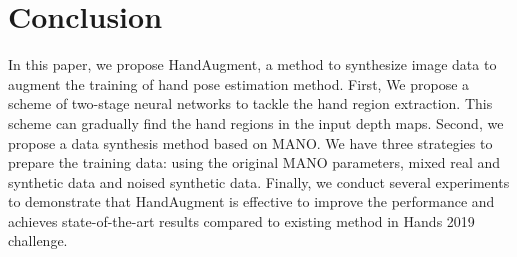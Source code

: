 \documentclass{article}
\begin{document}
\section{Conclusion}
In this paper, we propose HandAugment, a method to synthesize image data to augment the training of hand pose estimation method. 
First, We propose a scheme of two-stage neural networks to tackle the hand region extraction. This scheme can gradually find the hand regions in the input depth maps.
Second, we propose a data synthesis method based on MANO. We have three strategies to prepare the training data: using the original MANO parameters, mixed real and synthetic data and noised synthetic data.
Finally, we conduct several experiments to demonstrate that HandAugment is effective to improve the performance and achieves state-of-the-art results compared to existing method in Hands 2019 challenge.  
\newpage


\end{document}
